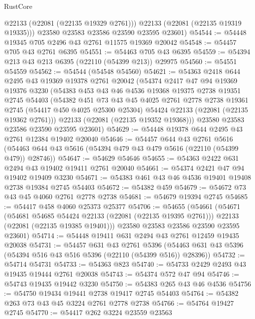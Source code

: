 \begin{lexlean}{RustCore}
\begin{coremodule}
          @22133
          (@22081 (@22135 @19329 @2761)))
        @22133
        (@22081 (@22135 @19319 @19335)))
      @23580
      @23583
      @23586
      @23590
      @23595
      @23601)
@54544 := @54448 @19345 @705 @2496 @43 @2761 @11575 @19369 @20042
@54548 := @54457 @705 @43 @2761 @6395
@54551 := @54463 @705 @43 @6395
@54559 := @54394 @213 @43 @213 @6395 (@22110 (@54399 @213)) @29975
@54560 := @54551 @54559
@54562 := @54544 (@54548 @54560)
@54621 := @54363
    @2418
    @644
    @2495
    @43
    @19369
    @19378
    @2761
    @20042
    (@54374
      @2417
      @47
      @94
      @19369
      @19376
      @3230
      (@54383
        @453
        @43
        @46
        @4536
        @19368
        @19375
        @2738
        @19351
        @2745
        @54403
        (@54382
          @451
          @73
          @43
          @45
          @4025
          @2761
          @2778
          @2738
          @19361
          @2745
          (@54417 @450 @4025 @25300 @25304)
          @54424
          @22133
          (@22081 (@22135 @19362 @2761)))
        @22133
        (@22081 (@22135 @19352 @19368)))
      @23580
      @23583
      @23586
      @23590
      @23595
      @23601)
@54629 := @54448 @19378 @644 @2495 @43 @2761 @12384 @19402 @20040
@54646 := @54457
    @644
    @43
    @2761
    @5616
    (@54463 @644 @43 @5616 (@54394 @479 @43 @479 @5616 (@22110 (@54399 @479)) @28746))
@54647 := @54629 @54646
@54655 := @54363 @2422 @631 @2494 @43 @19402 @19411 @2761 @20040
@54661 := @54374 @2421 @47 @94 @19402 @19409 @3230
@54671 := @54383 @461 @43 @46 @4536 @19401 @19408 @2738 @19384 @2745 @54403
@54672 := @54382 @459
@54679 := @54672 @73 @43 @45 @4060 @2761 @2778 @2738
@54681 := @54679 @19394 @2745
@54685 := @54417 @458 @4060 @25373 @25377
@54706 := @54655
    (@54661
      (@54671
        (@54681 @54685 @54424 @22133 (@22081 (@22135 @19395 @2761)))
        @22133
        (@22081 (@22135 @19385 @19401)))
      @23580
      @23583
      @23586
      @23590
      @23595
      @23601)
@54714 := @54448 @19411 @631 @2494 @43 @2761 @12459 @19435 @20038
@54731 := @54457
    @631
    @43
    @2761
    @5396
    (@54463 @631 @43 @5396 (@54394 @516 @43 @516 @5396 (@22110 (@54399 @516)) @28396))
@54732 := @54714 @54731
@54733 := @54363 @823
@54740 := @54733 @2429 @2493 @43 @19435 @19444 @2761 @20038
@54743 := @54374 @572 @47 @94
@54746 := @54743 @19435 @19442 @3230
@54750 := @54383 @265 @43 @46 @4536
@54756 := @54750 @19434 @19441 @2738 @19417 @2745 @54403
@54764 := @54382 @263 @73 @43 @45 @3224 @2761 @2778 @2738
@54766 := @54764 @19427 @2745
@54770 := @54417 @262 @3224 @23559 @23563

\end{coremodule}
\end{lexlean}
